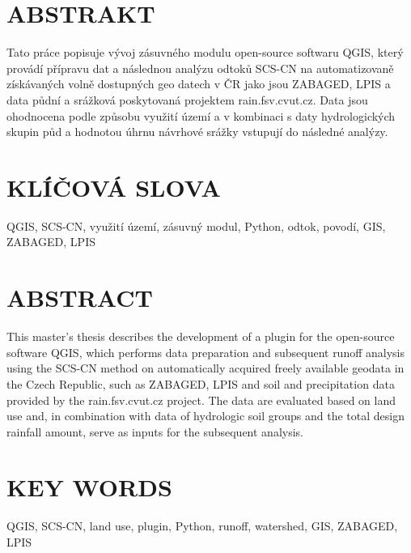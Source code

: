 \documentclass[a4paper,oneside,12pt]{book}
\begin{document}
\newbox\odstavecbox
\newlength\vyskaodstavce
\newcommand\odstavec[2]{%
    \setbox\odstavecbox=\hbox{%
         \parbox[t]{#1}{#2\vrule width 0pt depth 4pt}}%
    \global\vyskaodstavce=\dp\odstavecbox
    \box\odstavecbox}
\newcommand{\delka}{120mm} %


\section*{ABSTRAKT}
\begin{flushleft}
Tato práce popisuje vývoj zásuvného modulu open-source softwaru QGIS, který provádí přípravu dat a následnou analýzu odtoků SCS-CN  na automatizovaně získávaných volně dostupných geo datech v ČR jako jsou ZABAGED, LPIS a data půdní a srážková poskytovaná projektem rain.fsv.cvut.cz. Data jsou ohodnocena podle způsobu využití území a v kombinaci s daty hydrologických skupin půd a hodnotou úhrnu návrhové srážky vstupují do následné analýzy.
\end{flushleft}


\section*{KLÍČOVÁ SLOVA}
\begin{flushleft}
QGIS, SCS-CN, využití území, zásuvný modul, Python, odtok, povodí, GIS, ZABAGED, LPIS
\end{flushleft}


\section*{ABSTRACT}
\begin{flushleft}
This master's thesis describes the development of a plugin for the open-source software QGIS, which performs data preparation and subsequent runoff analysis using the SCS-CN method on automatically acquired freely available geodata in the Czech Republic, such as ZABAGED, LPIS  and soil and precipitation data provided by the rain.fsv.cvut.cz project. The data are evaluated based on land use and, in combination with data of hydrologic soil groups and the total design rainfall amount, serve as inputs for the subsequent analysis.
\end{flushleft}


\section*{KEY WORDS}
\begin{flushleft}
QGIS, SCS-CN, land use, plugin, Python, runoff, watershed, GIS, ZABAGED, LPIS
\end{flushleft}
\end{document}
